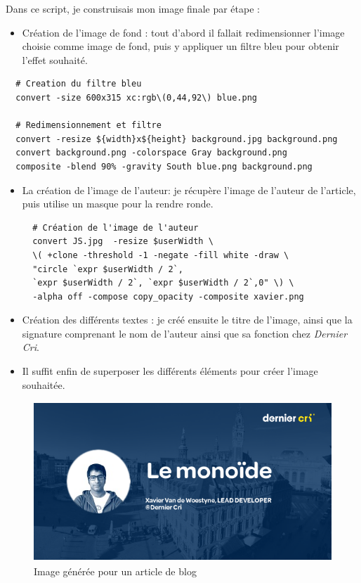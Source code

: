 \documentclass[12pt,a4paper]{article}
\providecommand{\tightlist}{%
  \setlength{\itemsep}{0pt}\setlength{\parskip}{0pt}}
\begin{document}
  \bigskip

  Dans ce script, je construisais mon image finale par étape :

  \begin{itemize}
  \tightlist
  \item
    Création de l'image de fond : tout d'abord il fallait redimensionner
    l'image choisie comme image de fond, puis y appliquer un filtre bleu
    pour obtenir l'effet souhaité.
  \end{itemize}

  \begin{verbatim}
  # Creation du filtre bleu
  convert -size 600x315 xc:rgb\(0,44,92\) blue.png

  # Redimensionnement et filtre
  convert -resize ${width}x${height} background.jpg background.png
  convert background.png -colorspace Gray background.png
  composite -blend 90% -gravity South blue.png background.png
  \end{verbatim}

  \begin{itemize}
  \item
    La création de l'image de l'auteur: je récupère l'image de l'auteur de
    l'article, puis utilise un masque pour la rendre ronde.

  \begin{verbatim}
  # Création de l'image de l'auteur
  convert JS.jpg  -resize $userWidth \
  \( +clone -threshold -1 -negate -fill white -draw \
  "circle `expr $userWidth / 2`,
  `expr $userWidth / 2`, `expr $userWidth / 2`,0" \) \
  -alpha off -compose copy_opacity -composite xavier.png
  \end{verbatim}
  \item
    Création des différents textes : je créé ensuite le titre de l'image,
    ainsi que la signature comprenant le nom de l'auteur ainsi que sa
    fonction chez \emph{Dernier Cri}.
  \item
    Il suffit enfin de superposer les différents éléments pour créer
    l'image souhaitée.
  \end{itemize}

  \begin{figure}[h]
    \centering
    \includegraphics[height=6cm]{figures/blog.png}
    \caption{Image générée pour un article de blog}
  \end{figure}
\end{document}
